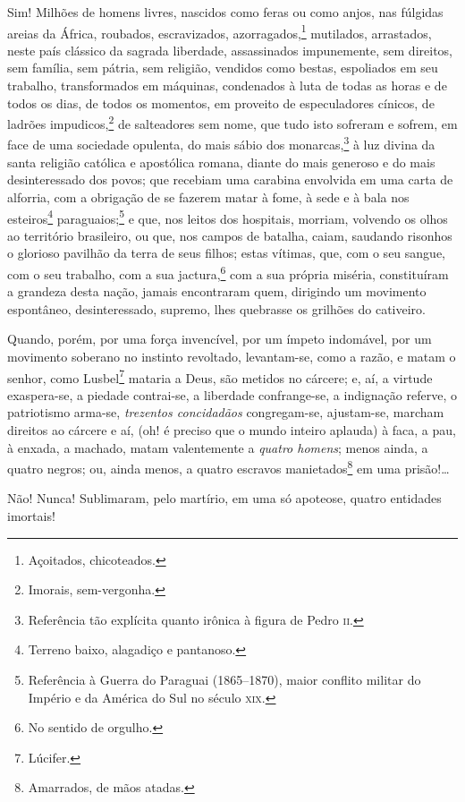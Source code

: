 {Sim! Milhões de homens livres, nascidos como feras ou como anjos, nas
fúlgidas areias da África, roubados, escravizados, azorragados,\footnote{
  Açoitados, chicoteados.} mutilados, arrastados, neste país clássico
da sagrada liberdade, assassinados impunemente, sem direitos, sem
família, sem pátria, sem religião, vendidos como bestas, espoliados em
seu trabalho, transformados em máquinas, condenados à luta de todas as
horas e de todos os dias, de todos os momentos, em proveito de
especuladores cínicos, de ladrões impudicos,\footnote{Imorais,
  sem-vergonha.} de salteadores sem nome, que tudo isto sofreram e
sofrem, em face de uma sociedade opulenta, do mais sábio dos
monarcas,\footnote{Referência tão explícita quanto irônica à figura de
  Pedro \textsc{ii}.} à luz divina da santa religião católica e apostólica
romana, diante do mais generoso e do mais desinteressado dos povos; que
recebiam uma carabina envolvida em uma carta de alforria, com a
obrigação de se fazerem matar à fome, à sede e à bala nos
esteiros\footnote{Terreno baixo, alagadiço e pantanoso.}
paraguaios;\footnote{Referência à Guerra do Paraguai (1865--1870), maior
  conflito militar do Império e da América do Sul no século \textsc{xix}.} e
que, nos leitos dos hospitais, morriam, volvendo os olhos ao território
brasileiro, ou que, nos campos de batalha, caiam, saudando risonhos o
glorioso pavilhão da terra de seus filhos; estas vítimas, que, com o seu
sangue, com o seu trabalho, com a sua jactura,\footnote{No sentido de
  orgulho.} com a sua própria miséria, constituíram a grandeza desta
nação, jamais encontraram quem, dirigindo um movimento espontâneo,
desinteressado, supremo, lhes quebrasse os grilhões do cativeiro.

Quando, porém, por uma força invencível, por um ímpeto indomável, por um
movimento soberano no instinto revoltado, levantam-se, como a razão, e
matam o senhor, como Lusbel\footnote{Lúcifer.} mataria a Deus, são
metidos no cárcere; e, aí, a virtude exaspera-se, a piedade contrai-se,
a liberdade confrange-se, a indignação referve, o patriotismo arma-se,
\emph{trezentos concidadãos} congregam-se, ajustam-se, marcham direitos
ao cárcere e aí, (oh! é preciso que o mundo inteiro aplauda) à faca, a
pau, à enxada, a machado, matam valentemente a \emph{quatro homens};
menos ainda, a quatro negros; ou, ainda menos, a quatro escravos
manietados\footnote{Amarrados, de mãos atadas.} em uma prisão!\ldots{}

Não! Nunca! Sublimaram, pelo martírio, em uma só apoteose, quatro
entidades imortais!

}
